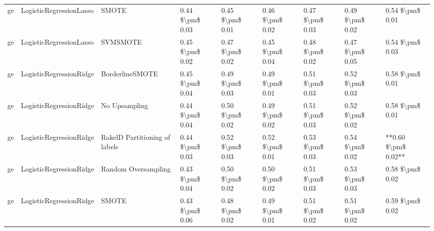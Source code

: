 \begin{tabular}{lllllllll}
      ge &         LogisticRegressionLasso &                         SMOTE & 0.44 \$\textbackslash pm\$ 0.03 &           0.45 \$\textbackslash pm\$ 0.01 &       0.46 \$\textbackslash pm\$ 0.02 &        0.47 \$\textbackslash pm\$ 0.03 &                         0.49 \$\textbackslash pm\$ 0.02 &     0.54 \$\textbackslash pm\$ 0.01 \\
      ge &         LogisticRegressionLasso &                      SVMSMOTE & 0.45 \$\textbackslash pm\$ 0.02 &           0.47 \$\textbackslash pm\$ 0.02 &       0.45 \$\textbackslash pm\$ 0.04 &        0.48 \$\textbackslash pm\$ 0.02 &                         0.47 \$\textbackslash pm\$ 0.05 &     0.54 \$\textbackslash pm\$ 0.03 \\
      ge &         LogisticRegressionRidge &               BorderlineSMOTE & 0.45 \$\textbackslash pm\$ 0.04 &           0.49 \$\textbackslash pm\$ 0.03 &       0.49 \$\textbackslash pm\$ 0.01 &        0.51 \$\textbackslash pm\$ 0.03 &                         0.52 \$\textbackslash pm\$ 0.03 &     0.58 \$\textbackslash pm\$ 0.01 \\
      ge &         LogisticRegressionRidge &                 No Upsampling & 0.44 \$\textbackslash pm\$ 0.04 &           0.50 \$\textbackslash pm\$ 0.02 &       0.49 \$\textbackslash pm\$ 0.02 &        0.51 \$\textbackslash pm\$ 0.03 &                         0.52 \$\textbackslash pm\$ 0.02 &     0.58 \$\textbackslash pm\$ 0.01 \\
      ge &         LogisticRegressionRidge & RakelD Partitioning of labels & 0.44 \$\textbackslash pm\$ 0.03 &           0.52 \$\textbackslash pm\$ 0.03 &       0.52 \$\textbackslash pm\$ 0.01 &        0.53 \$\textbackslash pm\$ 0.03 &                         0.54 \$\textbackslash pm\$ 0.02 & **0.60 \$\textbackslash pm\$ 0.02** \\
      ge &         LogisticRegressionRidge &           Random Oversampling & 0.43 \$\textbackslash pm\$ 0.04 &           0.50 \$\textbackslash pm\$ 0.02 &       0.50 \$\textbackslash pm\$ 0.02 &        0.51 \$\textbackslash pm\$ 0.03 &                         0.53 \$\textbackslash pm\$ 0.03 &     0.58 \$\textbackslash pm\$ 0.02 \\
      ge &         LogisticRegressionRidge &                         SMOTE & 0.43 \$\textbackslash pm\$ 0.06 &           0.48 \$\textbackslash pm\$ 0.02 &       0.49 \$\textbackslash pm\$ 0.01 &        0.51 \$\textbackslash pm\$ 0.02 &                         0.51 \$\textbackslash pm\$ 0.02 &     0.59 \$\textbackslash pm\$ 0.02 \\

\end{tabular}
